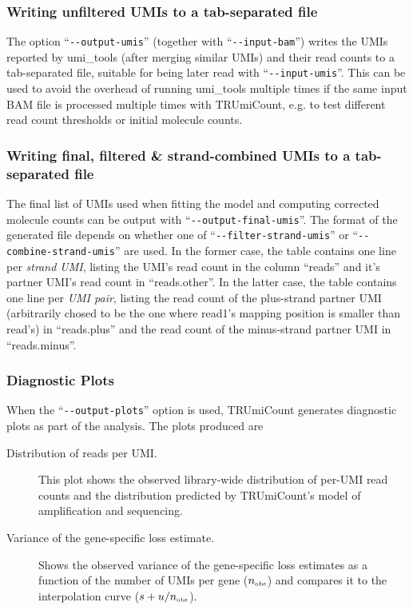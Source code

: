 \documentclass[10pt]{article}
\newcommand{\ddarg}[1]{\texttt{-{}-#1}}
\begin{document}
\subsubsection*{Writing unfiltered UMIs to a tab-separated file }

The option ``\ddarg{output-umis}'' (together with ``\ddarg{input-bam}'') writes the UMIs reported by umi\_tools (after merging similar UMIs) and their read counts to a tab-separated file, suitable for being later read with ``\ddarg{input-umis}''. This can be used to avoid the overhead of running umi\_tools multiple times if the same input BAM file is processed multiple times with TRUmiCount, e.g. to test different read count thresholds or initial molecule counts.

\subsubsection*{Writing final, filtered \& strand-combined UMIs to a tab-separated file }

The final list of UMIs used when fitting the model and computing corrected molecule counts can be output with ``\ddarg{output-final-umis}''. The format of the generated file depends on whether one of ``\ddarg{filter-strand-umis}'' or ``\ddarg{combine-strand-umis}'' are used. In the former case, the table contains one line per \emph{strand UMI}, listing the UMI's read count in the column ``reads'' and it's partner UMI's read count in ``reads.other''. In the latter case, the table contains one line per \emph{UMI pair}, listing the read count of the plus-strand partner UMI (arbitrarily chosed to be the one where read1's mapping position is smaller than read's) in ``reads.plus'' and the read count of the minus-strand partner UMI in ``reads.minus''.

\subsubsection*{Diagnostic Plots}

When the ``\ddarg{output-plots}'' option is used, TRUmiCount generates diagnostic plots as part of the analysis. The plots produced are

\begin{description}
\item[Distribution of reads per UMI.] This plot shows the observed library-wide distribution of per-UMI read counts and the distribution predicted by TRUmiCount's model of amplification and sequencing.

\item[Variance of the gene-specific loss estimate.] Shows the observed variance of the gene-specific loss estimates as a function of the number of UMIs per gene ($n_{\textrm{\tiny obs}}$) and compares it to the interpolation curve ($s + u / n_{\textrm{\tiny obs}}$).
\end{description}
\end{document}
